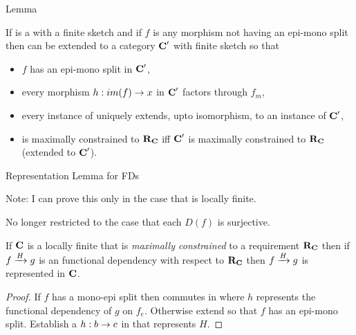 \documentclass[xcolor=pst,dvips]{beamer}   %
\begin{document}
\begin{frame}{Lemma}
\begin{lemma}
If \catcw is a \catMEterm with a finite sketch and if $f$ is any  morphism 
not having an epi-mono split then \catcw can be extended to a category $\catcp$ with finite sketch so that
\begin{itemize} 
\item $f$ has an epi-mono split in $\catcp$,
\item every morphism $h:im(f) \morph x$ in $\catcp$ factors through $f_m$,
\item every instance of \catcw uniquely extends, upto isomorphism, to an instance of $\catcp$,
\item \catcw is maximally constrained to $\reqtc$ iff $\catcp$ is maximally constrained to $\reqtc$ (extended to $\catcp$).
\end{itemize} 
\end{lemma} 
\end{frame}
\begin{frame}{Representation Lemma for FDs}
{\small Note: I can prove this only in the case that \catcw is locally finite.

No longer restricted to the case that each $D(f)$ is surjective.}

\begin{lemma}
If $\catc$ is a locally finite \catMEterm that is 
\textit{maximally constrained} to a requirement $\reqtc$ then
if $\fundep{H}{f}{g}$  is an   functional dependency with respect to $\reqtc$
then $\fundep{H}{f}{g}$ is represented in $\catc$.
\end{lemma}
\begin{proof} If $f$ has a mono-epi split then
 commutes in \catcw  where $h$ represents 
the functional dependency of $g$ on $f_e$.
Otherwise extend \catcw so that $f$ has an epi-mono split.
Establish a $h: b \morph c$ in \catcw that represents $H$.
\end{proof}
\end{frame}
\end{document}
